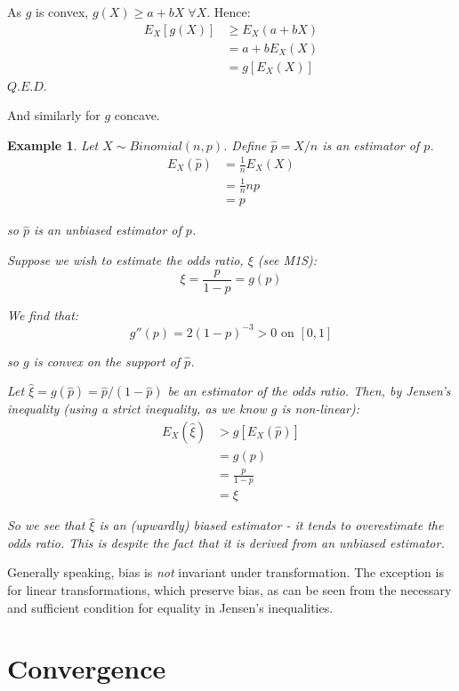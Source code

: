 \documentclass[12pt,a4paper]{article}
\newtheorem{ex}[thm]{Example}
\begin{document}
As $g$ is convex, $g(X)\geq a+bX\;\forall X$. Hence:
\begin{align*}
E_X[g(X)] &\geq E_X(a+bX)\\
&=a+bE_X(X)\\
&= g[E_X(X)]
\end{align*}\hfill$Q.E.D.$

And similarly for $g$ concave.

\begin{ex}

Let $X\sim Binomial(n,p)$. Define $\hat{p} = X/n$ is an estimator of $p$.
\begin{align*}
E_X(\hat{p}) &= \frac{1}{n}E_X(X)\\
&= \frac{1}{n}np\\
&= p
\end{align*}

so $\hat{p}$ is an unbiased estimator of $p$.

Suppose we wish to estimate the odds ratio, $\xi$ (see M1S):
$$\xi = \frac{p}{1-p}=g(p)$$

We find that:
$$g''(p) = 2(1-p)^{-3} >0 \mbox{ on $[0,1]$}$$

so $g$ is convex on the support of $\hat{p}$.

Let $\hat{\xi} = g(\hat{p}) = \hat{p}/(1-\hat{p})$ be an estimator of the odds ratio. Then, by Jensen's inequality (using a strict inequality, as we know $g$ is non-linear):
\begin{align*}
E_X\left(\hat{\xi}\right) &> g[E_X(\hat{p})]\\
&= g(p)\\
&= \frac{p}{1-p}\\
&= \xi
\end{align*}

So we see that $\hat{\xi}$ is an (upwardly) biased estimator - it tends to overestimate the odds ratio. This is despite the fact that it is derived from an unbiased estimator.

\end{ex}

Generally speaking, bias is \emph{not} invariant under transformation. The exception is for linear transformations, which preserve bias, as can be seen from the necessary and sufficient condition for equality in Jensen's inequalities.


\clearpage
\section{Convergence}$\;$
\end{document}
